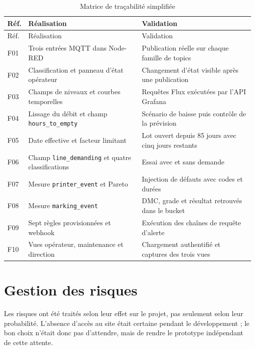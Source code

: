 \begin{longtable}{p{}p{}p{}}
\caption{Matrice de traçabilité simplifiée}\\
\toprule
Réf. & Réalisation & Validation \\
\midrule
\endfirsthead
\toprule
Réf. & Réalisation & Validation \\
\midrule
\endhead
F01 & Trois entrées MQTT dans Node-RED & Publication réelle sur chaque famille de topics \\
F02 & Classification et panneau d'état opérateur & Changement d'état visible après une publication \\
F03 & Champs de niveaux et courbes temporelles & Requêtes Flux exécutées par l'API Grafana \\
F04 & Lissage du débit et champ \texttt{hours\_to\_empty} & Scénario de baisse puis contrôle de la prévision \\
F05 & Date effective et facteur limitant & Lot ouvert depuis 85 jours avec cinq jours restants \\
F06 & Champ \texttt{line\_demanding} et quatre classifications & Essai avec et sans demande \\
F07 & Mesure \texttt{printer\_event} et Pareto & Injection de défauts avec codes et durées \\
F08 & Mesure \texttt{marking\_event} & DMC, grade et résultat retrouvés dans le bucket \\
F09 & Sept règles provisionnées et webhook & Exécution des chaînes de requête d'alerte \\
F10 & Vues opérateur, maintenance et direction & Chargement authentifié et captures des trois vues \\
\bottomrule
\end{longtable}

\section{Gestion des risques}

Les risques ont été traités selon leur effet sur le projet, pas seulement
selon leur probabilité. L'absence d'accès au site était certaine pendant le
développement ; le bon choix n'était donc pas d'attendre, mais de rendre le
prototype indépendant de cette attente.

